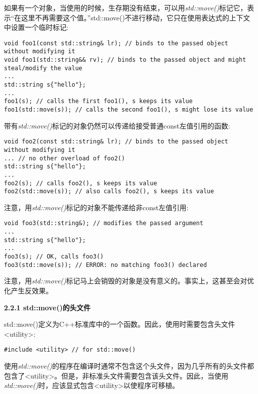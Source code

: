 如果有一个对象，当使用的时候，生存期没有结束，可以用\textit{std::move()}标记它，表示“在这里不再需要这个值。”std::move()不进行移动，它只在使用表达式的上下文中设置一个临时标记:\par

\begin{lstlisting}[caption={}]
void foo1(const std::string& lr); // binds to the passed object without modifying it
void foo1(std::string&& rv); // binds to the passed object and might steal/modify the value
...
std::string s{"hello"};
...
foo1(s); // calls the first foo1(), s keeps its value
foo1(std::move(s)); // calls the second foo1(), s might lose its value
\end{lstlisting}

带有\textit{std::move()}标记的对象仍然可以传递给接受普通const左值引用的函数:\par

\begin{lstlisting}[caption={}]
void foo2(const std::string& lr); // binds to the passed object without modifying it
... // no other overload of foo2()
std::string s{"hello"};
...
foo2(s); // calls foo2(), s keeps its value
foo2(std::move(s)); // also calls foo2(), s keeps its value
\end{lstlisting}

注意，用\textit{std::move()}标记的对象不能传递给非const左值引用:\par

\begin{lstlisting}[caption={}]
void foo3(std::string&); // modifies the passed argument
...
std::string s{"hello"};
...
foo3(s); // OK, calls foo3()
foo3(std::move(s)); // ERROR: no matching foo3() declared
\end{lstlisting}

注意，用\textit{std::move()}标记马上会销毁的对象是没有意义的。事实上，这甚至会对优化产生反效果。

\hspace*{\fill} \par %
\textbf{2.2.1 std::move()的头文件}

std::move()定义为C++标准库中的一个函数。因此，使用时需要包含头文件<utility>:\par

\begin{lstlisting}[caption={}]
#include <utility> // for std::move()
\end{lstlisting}

使用\textit{std::move()}的程序在编译时通常不包含这个头文件，因为几乎所有的头文件都包含了<utility>。但是，非标准头文件需要包含该头文件。因此，当使用\textit{std::move()}时，应该显式包含<utility>以使程序可移植。\par


